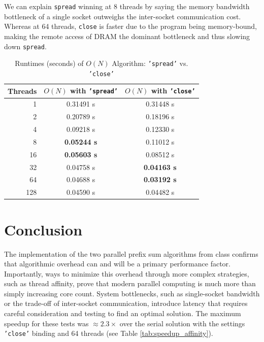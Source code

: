 \documentclass[11pt, letterpaper]{article}
\begin{document}
We can explain \texttt{spread} winning at 8 threads by saying the memory bandwidth bottleneck of a single socket outweighs the inter-socket communication cost. Whereas at 64 threads, \texttt{close} is faster due to the program being memory-bound, making the remote access of DRAM the dominant bottleneck and thus slowing down \texttt{spread}.

\begin{table}[h!]
    \centering
    \caption{Runtimes (seconds) of $O(N)$ Algorithm: \texttt{'spread'} vs. \texttt{'close'}}
    \label{tab:affinity}
    \begin{tabular}{rcc}
        \toprule
        Threads & $O(N)$ with \texttt{'spread'} & $O(N)$ with \texttt{'close'} \\
        \midrule
        1   & 0.31491 s & 0.31448 s \\
        2   & 0.20789 s & 0.18196 s \\
        4   & 0.09218 s & 0.12330 s \\
        8   & \textbf{0.05244 s} & 0.11012 s \\
        16  & \textbf{0.05603 s} & 0.08512 s \\
        32  & 0.04758 s & \textbf{0.04163 s} \\
        64  & 0.04688 s & \textbf{0.03192 s} \\
        128 & 0.04590 s & 0.04482 s \\
        \bottomrule
    \end{tabular}
\end{table}

\section{Conclusion}
The implementation of the two parallel prefix sum algorithms from class confirms that algorithmic overhead can and will be a primary performance factor. Importantly, ways to minimize this overhead through more complex strategies, such as thread affinity, prove that modern parallel computing is much more than simply increasing core count. System bottlenecks, such as single-socket bandwidth or the trade-off of inter-socket communication, introduce latency that requires careful consideration and testing to find an optimal solution. The maximum speedup for these tests was $\approx 2.3\times$  over the serial solution with the settings \texttt{'close'} binding and 64 threads (see Table \ref{tab:speedup_affinity}).
\end{document}
